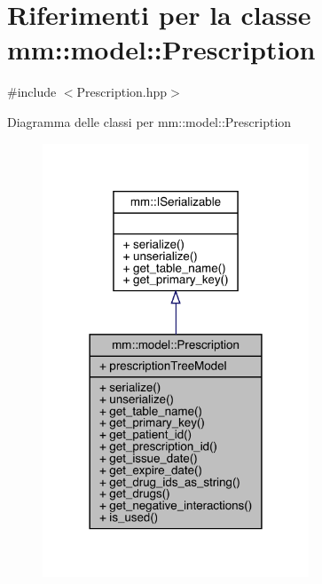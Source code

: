 \hypertarget{classmm_1_1model_1_1_prescription}{}\section{Riferimenti per la classe mm\+:\+:model\+:\+:Prescription}
\label{classmm_1_1model_1_1_prescription}


{\ttfamily \#include $<$Prescription.\+hpp$>$}



Diagramma delle classi per mm\+:\+:model\+:\+:Prescription\nopagebreak
\begin{figure}[H]
\begin{center}
\leavevmode
\includegraphics[width=225pt]{da/d21/classmm_1_1model_1_1_prescription__inherit__graph}
\end{center}
\end{figure}


